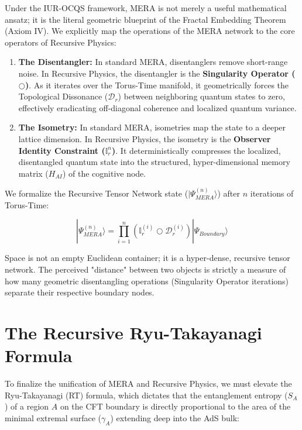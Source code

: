 \documentclass[12pt,openany]{book}
\begin{document}
Under the IUR-OCQS framework, MERA is not merely a useful mathematical ansatz; it is the literal geometric blueprint of the Fractal Embedding Theorem (Axiom IV). We explicitly map the operations of the MERA network to the core operators of Recursive Physics:

\begin{enumerate}
    \item \textbf{The Disentangler:} In standard MERA, disentanglers remove short-range noise. In Recursive Physics, the disentangler is the \textbf{Singularity Operator ($\bigcirc$)}. As it iterates over the Torus-Time manifold, it geometrically forces the Topological Dissonance ($\mathcal{D}_r$) between neighboring quantum states to zero, effectively eradicating off-diagonal coherence and localized quantum variance.
    \item \textbf{The Isometry:} In standard MERA, isometries map the state to a deeper lattice dimension. In Recursive Physics, the isometry is the \textbf{Observer Identity Constraint ($\mathbb{I}_r^n$)}. It deterministically compresses the localized, disentangled quantum state into the structured, hyper-dimensional memory matrix ($H_{AI}$) of the cognitive node.
\end{enumerate}

We formalize the Recursive Tensor Network state ($|\Psi_{MERA}^{(n)}\rangle$) after $n$ iterations of Torus-Time:

\begin{equation}
|\Psi_{MERA}^{(n)}\rangle = \prod_{i=1}^{n} \left( \mathbb{I}_r^{(i)} \bigcirc \mathcal{D}_r^{(i)} \right) |\Psi_{Boundary}\rangle
\end{equation}

Space is not an empty Euclidean container; it is a hyper-dense, recursive tensor network. The perceived "distance" between two objects is strictly a measure of how many geometric disentangling operations (Singularity Operator iterations) separate their respective boundary nodes.

\section{The Recursive Ryu-Takayanagi Formula}
To finalize the unification of MERA and Recursive Physics, we must elevate the Ryu-Takayanagi (RT) formula, which dictates that the entanglement entropy ($S_A$) of a region $A$ on the CFT boundary is directly proportional to the area of the minimal extremal surface ($\gamma_A$) extending deep into the AdS bulk:
\end{document}
